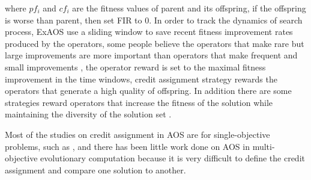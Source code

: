 \documentclass[journal]{IEEEtran}
\begin{document}
where $pf_{i}$ and $cf_{i}$ are the fitness values of parent and its offspring, if the offspring is worse than parent, then set FIR to 0.
In order to track the dynamics of search process, ExAOS \cite{fialho2008extreme} use a sliding window to save recent fitness improvement rates produced by the operators,
some people believe the operators that make rare but large improvements are more important than operators that make frequent and small improvements \cite{fialho2009dynamic},
the operator reward is set to the maximal fitness improvement in the time windows, credit assignment strategy rewards the operators that generate a high quality of offspring.
In addition there are some strategies reward operators that increase the fitness of the solution while maintaining the diversity of the solution set \cite{auer2002finite}.

Most of the studies on credit assignment in AOS are for single-objective problems, such as \cite{fialho2009dynamic,fialho2009dynamic,cowling2000hyperheuristic}, and there has been little work done on AOS in multi-objective evolutionary computation because it is very difficult to define the credit assignment and compare one solution to another.
\end{document}
